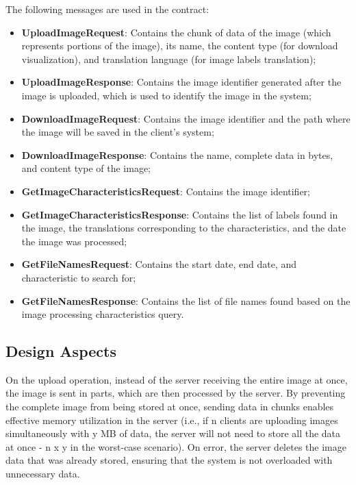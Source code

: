 The following messages are used in the contract:

\begin{itemize}
    \item \textbf{UploadImageRequest}:
    Contains the chunk of data of the image (which represents portions of the image), its name, the content type (for download visualization), and translation language (for image labels translation);
    \item \textbf{UploadImageResponse}:
    Contains the image identifier generated after the image is uploaded, which is used to identify the image in the system;
    \item \textbf{DownloadImageRequest}:
    Contains the image identifier and the path where the image will be saved in the client's system;
    \item \textbf{DownloadImageResponse}:
    Contains the name, complete data in bytes, and content type of the image;
    \item \textbf{GetImageCharacteristicsRequest}:
    Contains the image identifier;
    \item \textbf{GetImageCharacteristicsResponse}:
    Contains the list of labels found in the image, the translations corresponding to the characteristics, and the date the image was processed;
    \item \textbf{GetFileNamesRequest}:
    Contains the start date, end date, and characteristic to search for;
    \item \textbf{GetFileNamesResponse}:
    Contains the list of file names found based on the image processing characteristics query.
\end{itemize}

\subsection{Design Aspects}\label{subsec:functional-operations-design-aspects}

On the upload operation, instead of the server receiving the entire image at once, the image is sent in parts, which are then processed by the server.
By preventing the complete image from being stored at once,
sending data in chunks enables effective memory utilization in the server
(i.e., if n clients are uploading images simultaneously with y MB of data, the server will not need to store all the data at once - n x y in the worst-case scenario).
On error, the server deletes the image data that was already stored, ensuring that the system is not overloaded with unnecessary data.

